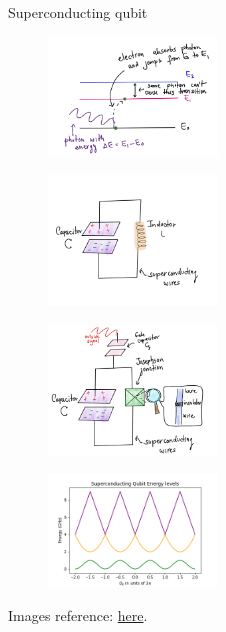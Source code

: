 \documentclass[8pt, xcolor={svgnames}, hyperref={colorlinks,linkcolor=black, citecolor=amethyst, urlcolor=amethyst}]{beamer}
\begin{document}
\begin{frame}{Superconducting qubit}
\begin{multicols}{2}
\begin{figure}
    \centering 
    \includegraphics[width=0.4\textwidth]{figures/photon_absorb.png}
\end{figure}
\pause
\begin{figure}
    \centering 
    \includegraphics[width=0.4\textwidth]{figures/LC_circuit.png}
\end{figure}
\end{multicols}  
\begin{multicols}{2}
\pause
\begin{figure}
    \centering 
    \includegraphics[width=0.4\textwidth]{figures/JC_circuit.png}
\end{figure}
\pause
\begin{figure}
    \centering 
    \includegraphics[width=0.4\textwidth]{figures/energy_levels.png}
\end{figure}
\end{multicols}
Images reference: \href{https://pennylane.ai/qml/demos/tutorial_sc_qubits.html}{here}.  
\end{frame}
\end{document}
